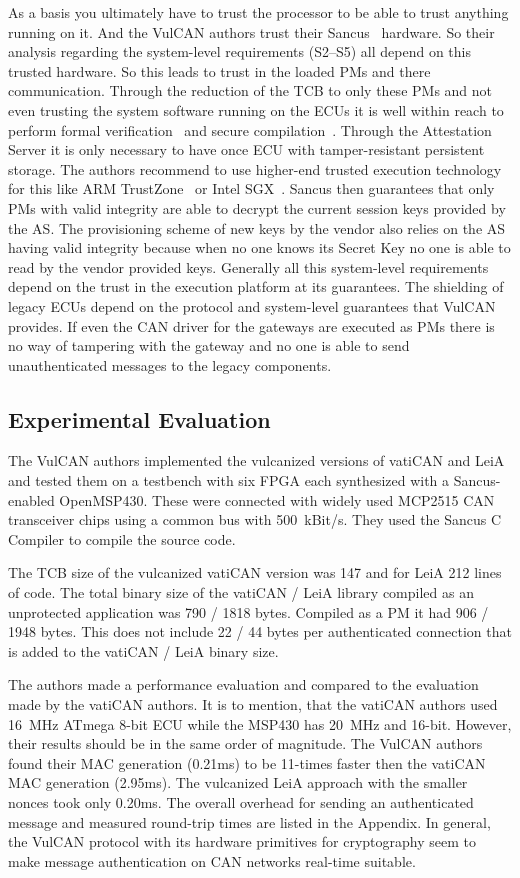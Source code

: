 As a basis you ultimately have to trust the processor to be able to trust
anything running on it. And the VulCAN authors trust their Sancus~\cite{Noorman}
hardware. So their analysis regarding the system-level requirements (S2--S5) all
depend on this trusted hardware. So this leads to trust in the loaded PMs and
there communication. Through the reduction of the TCB to only these PMs and not
even trusting the system software running on the ECUs it is well within reach to
perform formal verification~\cite{Philippaerts2014} and secure
compilation~\cite{Patrignani2015}. Through the Attestation Server it is only
necessary to have once ECU with tamper-resistant persistent storage. The authors
recommend to use higher-end trusted execution technology for this like ARM
TrustZone~\cite{Alves2004} or Intel SGX~\cite{McKeen2013}. Sancus then
guarantees that only PMs with valid integrity are able to decrypt the current
session keys provided by the AS\@. The provisioning scheme of new keys by the
vendor also relies on the AS having valid integrity because when no one knows
its Secret Key no one is able to read by the vendor provided keys. Generally all
this system-level requirements depend on the trust in the execution platform at
its guarantees. The shielding of legacy ECUs depend on the protocol and
system-level guarantees that VulCAN provides. If even the CAN driver for the
gateways are executed as PMs there is no way of tampering with the gateway and
no one is able to send unauthenticated messages to the legacy components.

\subsection{Experimental Evaluation}\label{subsec:experimental_evaluation}

The VulCAN authors implemented the vulcanized versions of vatiCAN and LeiA and tested them on a testbench with six FPGA each synthesized with a Sancus-enabled OpenMSP430. These were connected with widely used MCP2515 CAN transceiver chips using a common bus with 500~kBit/s. They used the Sancus C Compiler to compile the source code.

The TCB size of the vulcanized vatiCAN version was 147 and for LeiA 212 lines of code. The total binary size of the vatiCAN / LeiA library compiled as an unprotected application was 790 / 1818 bytes. Compiled as a PM it had 906 / 1948 bytes. This does not include 22 / 44 bytes per authenticated connection that is added to the vatiCAN / LeiA binary size.

The authors made a performance evaluation and compared to the evaluation made by
the vatiCAN authors. It is to mention, that the vatiCAN authors used 16~MHz
ATmega 8-bit ECU while the MSP430 has 20~MHz and 16-bit. However, their results
should be in the same order of magnitude. The VulCAN authors found their MAC
generation (0.21ms) to be 11-times faster then the vatiCAN MAC generation
(2.95ms). The vulcanized LeiA approach with the smaller nonces took only 0.20ms.
The overall overhead for sending an authenticated message and measured
round-trip times are listed in the Appendix. In general, the VulCAN protocol with its hardware primitives for cryptography seem to make message authentication on CAN networks real-time suitable.
